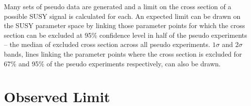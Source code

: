 Many sets of pseudo data are generated and a limit on the cross section of a 
possible SUSY signal is calculated for each. An expected limit can be drawn on 
the SUSY parameter space by linking those parameter points for which the cross 
section can be excluded at 95\% confidence level in half of the pseudo 
experiments -- the median of excluded cross section across all pseudo 
experiments. $1 \sigma$ and $2 \sigma$ bands, lines linking the parameter points
where the cross section is excluded for 67\% and 95\% of the pseudo experiments 
respectively, can also be drawn.

\section{Observed Limit}
